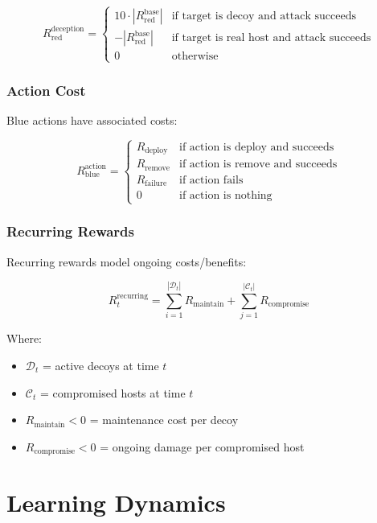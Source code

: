 \documentclass[12pt,a4paper]{article}
\begin{document}
\begin{equation}
R_{\text{red}}^{\text{deception}} = \begin{cases}
10 \cdot |R_{\text{red}}^{\text{base}}| & \text{if target is decoy and attack succeeds} \\
-|R_{\text{red}}^{\text{base}}| & \text{if target is real host and attack succeeds} \\
0 & \text{otherwise}
\end{cases}
\end{equation}

\subsubsection{Action Cost}
Blue actions have associated costs:

\begin{equation}
R_{\text{blue}}^{\text{action}} = \begin{cases}
R_{\text{deploy}} & \text{if action is deploy and succeeds} \\
R_{\text{remove}} & \text{if action is remove and succeeds} \\
R_{\text{failure}} & \text{if action fails} \\
0 & \text{if action is nothing}
\end{cases}
\end{equation}

\subsubsection{Recurring Rewards}
Recurring rewards model ongoing costs/benefits:

\begin{equation}
R_t^{\text{recurring}} = \sum_{i=1}^{|\mathcal{D}_t|} R_{\text{maintain}} + \sum_{j=1}^{|\mathcal{C}_t|} R_{\text{compromise}}
\end{equation}

Where:
\begin{itemize}
    \item $\mathcal{D}_t$ = active decoys at time $t$
    \item $\mathcal{C}_t$ = compromised hosts at time $t$
    \item $R_{\text{maintain}} < 0$ = maintenance cost per decoy
    \item $R_{\text{compromise}} < 0$ = ongoing damage per compromised host
\end{itemize}

\section{Learning Dynamics}
\end{document}
